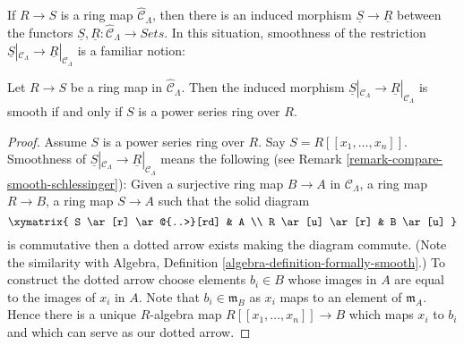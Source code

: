 \noindent
If $R \to S$ is a ring map $\widehat{\mathcal{C}}_\Lambda$, then there
is an induced morphism $\underline{S} \to \underline{R}$ between the
functors $\underline{S}, \underline{R}: \widehat{\mathcal{C}}_\Lambda
\to \textit{Sets}$.  In this situation, smoothness of the
restriction $\underline{S}|_{\mathcal{C}_\Lambda} \to
\underline{R}|_{\mathcal{C}_\Lambda}$ is a familiar notion:

\begin{lemma}
\label{lemma-smooth-morphism-power-series}
Let $R \to S$ be a ring map in $\widehat{\mathcal{C}}_\Lambda$. Then
the induced morphism
$\underline{S}|_{\mathcal{C}_\Lambda} \to \underline{R}|_{\mathcal{C}_\Lambda}$
is smooth if and only if $S$ is a power series ring over $R$.
\end{lemma}

\begin{proof}
Assume $S$ is a power series ring over $R$. Say $S = R[[x_1, \ldots, x_n]]$.
Smoothness of
$\underline{S}|_{\mathcal{C}_\Lambda} \to \underline{R}|_{\mathcal{C}_\Lambda}$
means the following (see Remark \ref{remark-compare-smooth-schlessinger}):
Given a surjective ring map $B \to A$ in
$\mathcal{C}_\Lambda$, a ring map $R \to B$, a ring map $S \to A$ such that
the solid diagram
$$
\xymatrix{
S \ar[r] \ar@{..>}[rd] & A \\
R \ar[u] \ar[r] & B \ar[u]
}
$$
is commutative then a dotted arrow exists making the diagram commute.
(Note the similarity with
Algebra, Definition \ref{algebra-definition-formally-smooth}.)
To construct the dotted arrow choose elements $b_i \in B$ whose images
in $A$ are equal to the images of $x_i$ in $A$. Note that
$b_i \in \mathfrak m_B$ as $x_i$ maps to an element of $\mathfrak m_A$.
Hence there is a unique $R$-algebra map $R[[x_1, \ldots, x_n]] \to B$
which maps $x_i$ to $b_i$ and which can serve as our dotted arrow.


\end{proof}
